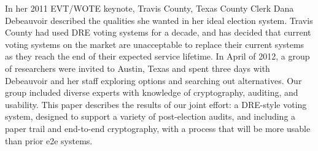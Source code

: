 ﻿  In her 2011 EVT/WOTE keynote, Travis County, Texas County Clerk
  Dana Debeauvoir described the qualities she wanted in her ideal election system.
  Travis County had used DRE voting systems for a decade, and has
  decided that current voting systems on the market are unacceptable
  to replace their current systems as they reach the end of their
  expected service lifetime.
  In April of 2012, a group of researchers were invited to Austin, Texas
  and spent three days with   Debeauvoir and her staff exploring options and
  searching out alternatives.  
  Our group included diverse experts with
  knowledge of cryptography, auditing, and usability. This paper
  describes the results of our joint effort: a DRE-style voting
  system, designed to support a variety of post-election audits, and
  including a paper trail and end-to-end cryptography, with a process
  that will be more usable than prior e2e systems.
